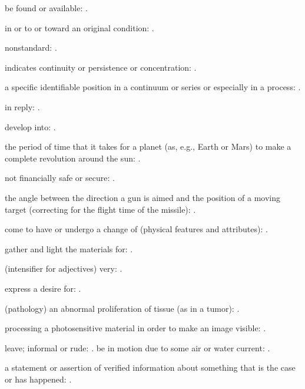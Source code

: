   be found or available: .

  in or to or toward an original condition: .

  nonstandard: .

  indicates continuity or persistence or concentration: .

  a specific identifiable position in a continuum or series or especially in a process:   .

  in reply: .

  develop into:   .

  the period of time that it takes for a planet (as, e.g., Earth or Mars) to make a complete revolution around the sun: .

  not financially safe or secure:   .

  the angle between the direction a gun is aimed and the position of a moving target (correcting for the flight time of the missile): .

  come to have or undergo a change of (physical features and attributes):   .

  gather and light the materials for: .

  (intensifier for adjectives) very:   .

  express a desire for: .

  (pathology) an abnormal proliferation of tissue (as in a tumor): .

  processing a photosensitive material in order to make an image visible:   .

  leave; informal or rude:   . be in motion due to some air or water current:   .

  a statement or assertion of verified information about something that is the case or has happened: .

